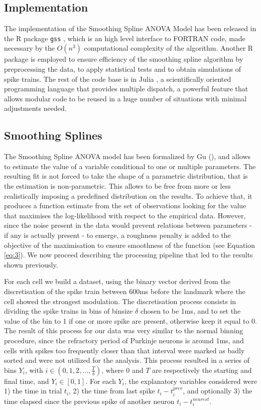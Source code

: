\subsection{Implementation}
The implementation of the Smoothing Spline ANOVA Model has been released in the R package \texttt{gss} \cite{gu2014smoothing}, which is an high level interface to FORTRAN code, made necessary by the $O(n^3)$ computational complexity of the algorithm. Another R package \cite{pouzat2009automatic} is employed to ensure efficiency of the smoothing spline algorithm by preprocessing the data, to apply statistical tests and to obtain simulations of spike trains. The rest of the code base is in Julia \cite{bezanson2012julia}, a scientifically oriented programming language that provides multiple dispatch, a powerful feature that allows modular code to be reused in a huge number of situations with minimal adjustments needed.

\subsection{Smoothing Splines}
The Smoothing Spline ANOVA model has been formalized by Gu (\cite{gu2013smoothing}), and allows to estimate the value of a variable conditional to one or multiple parameters. The resulting fit is not forced to take the shape of a parametric distribution, that is the estimation is non-parametric. This allows to be free from more or less realistically imposing a predefined distribution on the results. To achieve that, it produces a function estimate from the set of observations looking for the value that maximises the log-likelihood with respect to the empirical data.
However, since the noise present in the data would prevent relations between parameters - if any is actually present - to emerge, a roughness penalty is added to the objective of the maximisation to ensure smoothness of the function (see Equation \ref{eq:3}). We now proceed describing the processing pipeline that led to the results shown previously.

For each cell we build a dataset, using the binary vector derived from the discretisation of the spike train between 600ms before the landmark where the cell showed the strongest modulation. The discretisation process consists in dividing the spike trains in bins of binsize $\delta$ chosen to be 1ms, and to set the value of the bin to 1 if one or more spike are present, otherwise keep it equal to 0. The result of this process for our data was very similar to the normal binning procedure, since the refractory period of Purkinje neurons is around 1ms, and cells with spikes too frequently closer than that interval were marked as badly sorted and were not utilized for the analysis. This process resulted in a series of bins $Y_i$, with $i \in (0,1,2,\dots,\frac{T}{\delta})$, where 0 and $T$ are respectively the starting and final time, and $Y_i \in [0,1]$. For each $Y_i$, the explanatory variables considered were 1) the time in trial $t_i$, 2) the time from last spike $t_i-t_i^{prev}$, and optionally 3) the time elapsed since the previous spike of another neuron $t_i-t^{nearest}_i$.

